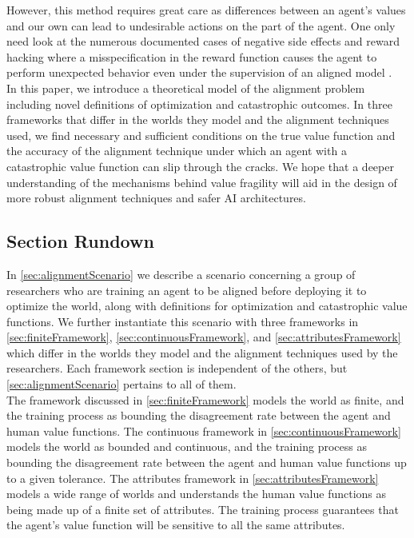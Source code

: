 \documentclass{article}
\begin{document}
However, this method requires great care as differences between an agent's values and our own can lead to undesirable actions on the part of the agent. One only need look at the numerous documented cases of negative side effects and reward hacking where a misspecification in the reward function causes the agent to perform unexpected behavior \citep{lehman2020surprising} even under the supervision of an aligned model \citep{baker2025monitoring}.\\

In this paper, we introduce a theoretical model of the alignment problem including novel definitions of optimization and catastrophic outcomes. In three frameworks that differ in the worlds they model and the alignment techniques used, we find necessary and sufficient conditions on the true value function and the accuracy of the alignment technique under which an agent with a catastrophic value function can slip through the cracks. We hope that a deeper understanding of the mechanisms behind value fragility will aid in the design of more robust alignment techniques and safer AI architectures.

\subsection{Section Rundown}
In \cref{sec:alignmentScenario} we describe a scenario concerning a group of researchers who are training an agent to be aligned before deploying it to optimize the world, along with definitions for optimization and catastrophic value functions. We further instantiate this scenario with three frameworks in \cref{sec:finiteFramework}, \cref{sec:continuousFramework}, and \cref{sec:attributesFramework} which differ in the worlds they model and the alignment techniques used by the researchers. Each framework section is independent of the others, but \cref{sec:alignmentScenario} pertains to all of them.\\

The framework discussed in \cref{sec:finiteFramework} models the world as finite, and the training process as bounding the disagreement rate between the agent and human value functions. The continuous framework in \cref{sec:continuousFramework} models the world as bounded and continuous, and the training process as bounding the disagreement rate between the agent and human value functions up to a given tolerance. The attributes framework in \cref{sec:attributesFramework} models a wide range of worlds and understands the human value functions as being made up of a finite set of attributes. The training process guarantees that the agent's value function will be sensitive to all the same attributes.
\end{document}
